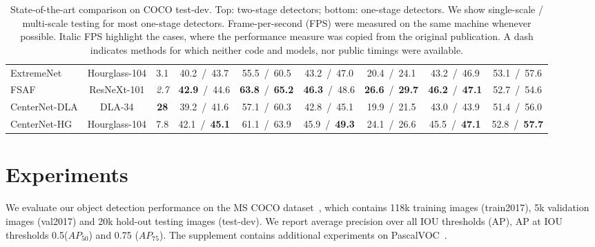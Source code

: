 \documentclass[10pt,twocolumn,letterpaper]{article}
\begin{document}
{\begin{table}[t]
\begin{tabular}{l@{}c@{\ \ }ccccccc}
        ExtremeNet~\cite{zhou2019bottomup} & Hourglass-104 & 3.1 &  40.2\ /\ 43.7 & 55.5\ /\ 60.5 & 43.2\ /\ 47.0 &  20.4\ /\ 24.1 & 43.2\ /\ 46.9 & 53.1\ /\ 57.6 \\
        FSAF~\cite{zhu2019feature} & ResNeXt-101 & \textit{2.7} & \textbf{42.9}\ /\ 44.6 & \textbf{63.8}\ /\ \textbf{65.2} & \textbf{46.3}\ /\ 48.6 & \textbf{26.6}\ /\ \textbf{29.7} & \textbf{46.2}\ /\ \textbf{47.1} & 52.7\ /\ 54.6 \\
        CenterNet-DLA & DLA-34 &  \textbf{28} &  39.2\ /\ 41.6 & 57.1\ /\ 60.3 & 42.8\ /\ 45.1 &  19.9\ /\ 21.5 & 43.0\ /\ 43.9 & 51.4\ /\ 56.0 \\
        CenterNet-HG & Hourglass-104 & 7.8 & 42.1\ /\ \textbf{45.1} & 61.1\ /\ 63.9 & 45.9\ /\ \textbf{49.3} & 24.1\ /\ 26.6 & 45.5\ /\ \textbf{47.1} & 52.8\ /\ \textbf{57.7}\\
\bottomrule
\end{tabular}
\caption{State-of-the-art comparison on COCO test-dev. Top: two-stage detectors; bottom: one-stage detectors. We show single-scale / multi-scale testing for most one-stage detectors. Frame-per-second (FPS) were measured on the same machine whenever possible. Italic FPS highlight the cases, where the performance measure was copied from the original publication. A dash indicates methods for which neither code and models, nor public timings were available.}
\label{table:main}
\vspace{-1em}
\end{table}
\setlength{\tabcolsep}{1.4pt}
}


\section{Experiments}

We evaluate our object detection performance on the MS COCO dataset~\cite{lin2014microsoft}, which contains 118k training images (train2017), 5k validation images (val2017) and 20k hold-out testing images (test-dev).
We report average precision over all IOU thresholds (AP), AP at IOU thresholds 0.5($AP_{50}$) and 0.75 ($AP_{75}$). 
The supplement contains additional experiments on PascalVOC~\cite{pascal-voc-2012}.
\end{document}
